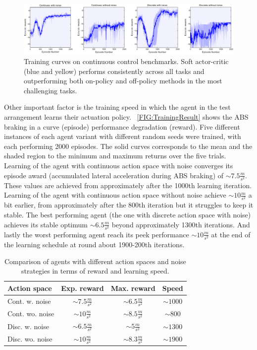\documentclass[a4paper, fleqn]{cas-dc}
\begin{document}
	\begin{figure}[hb]
		\centering
		\includegraphics[width=\textwidth]{figures/SAC_all_statistics.pdf}
		\caption{Training curves on continuous control benchmarks. Soft actor-critic (blue and yellow) performs
			consistently across all tasks and outperforming both on-policy and off-policy methods in the most challenging
			tasks.}
		\label{FIG:TrainingResult}
	\end{figure}
	
	Other important factor is the training speed in which the agent in the test arrangement learns their actuation policy. 
	~\autoref{FIG:TrainingResult} shows the ABS braking in a curve (episode) performance degradation (reward). Five different instances of each agent variant with different random seeds were trained, with each performing 2000 episodes. The solid curves corresponds to the mean and the shaded region to the minimum and maximum returns over the five trials.
	Learning of the agent with continuous action space with noise converges its episode award (accumulated lateral acceleration during ABS braking) of $\sim7.5 \frac{m}{s^2}$. These values are achieved from approximately after the 1000th learning iteration. Learning of the agent with continuous action space without noise achieve $\sim10 \frac{m}{s^2}$ a bit earlier, from approximately after the 800th iteration but it struggles to keep it stable. The best performing agent (the one with discrete action space with noise) achieves its stable optimum $\sim6.5 \frac{m}{s^2}$ beyond approximately 1300th iterations. And lastly the worst performing agent reach its peek performance $\sim10 \frac{m}{s^2}$ at the end of the learning schedule at round about 1900-200th iterations.
	
	\begin{table}[h!]
		\centering		
		\renewcommand{\arraystretch}{1.2} %
		\begin{tabular}{l|c|c|c}			
			Action space & Exp. reward & Max. reward & Speed \\
			\hline
			Cont. w. noise    & $\sim7.5\frac{m}{s^2}$  & $\sim6.5\frac{m}{s^2}$  & $\sim 1000$                \\
			Cont. wo. noise   & $\sim10\frac{m}{s^2}$   & $\sim8.5\frac{m}{s^2}$ & $\sim 800$                 \\
			Disc. w. noise    & $\sim6.5\frac{m}{s^2}$  & $\sim5\frac{m}{s^2}$   & $\sim 1300$                \\
			Disc. wo. noise   & $\sim10\frac{m}{s^2}$   & $\sim8.3\frac{m}{s^2}$ & $\sim 1900$                \\			
		\end{tabular}				
		\caption{Comparison of agents with different action spaces and noise strategies in terms of reward and learning speed.}
		\label{tab:action_space_comparison}
	\end{table}
	
\end{document}
